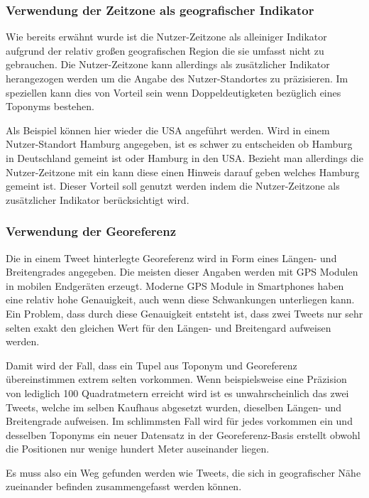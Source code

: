 					\subsubsection{Verwendung der Zeitzone als geografischer Indikator}

						Wie bereits erwähnt wurde ist die Nutzer-Zeitzone als alleiniger Indikator aufgrund der relativ großen geografischen Region die sie umfasst nicht zu gebrauchen. 
						Die Nutzer-Zeitzone kann allerdings als zusätzlicher Indikator herangezogen werden um die Angabe des Nutzer-Standortes zu präzisieren.	
						Im speziellen kann dies von Vorteil sein wenn Doppeldeutigketen bezüglich eines Toponyms bestehen. 

						Als Beispiel können hier wieder die USA angeführt werden. 
						Wird in einem Nutzer-Standort Hamburg angegeben, ist es schwer zu entscheiden ob Hamburg in Deutschland gemeint ist oder Hamburg in den USA. 
						Bezieht man allerdings die Nutzer-Zeitzone mit ein kann diese einen Hinweis darauf geben welches Hamburg gemeint ist.
						Dieser Vorteil soll genutzt werden indem die Nutzer-Zeitzone als zusätzlicher Indikator berücksichtigt wird.  

					\subsubsection{Verwendung der Georeferenz}  
						Die in einem Tweet hinterlegte Georeferenz wird in Form eines Längen- und Breitengrades angegeben.
						Die meisten dieser Angaben werden mit GPS Modulen in mobilen Endgeräten erzeugt. 
						Moderne GPS Module in Smartphones haben eine relativ hohe Genauigkeit, auch wenn diese Schwankungen unterliegen kann.
						Ein Problem, dass durch diese Genauigkeit entsteht ist, dass zwei Tweets nur sehr selten exakt den gleichen Wert für den Längen- und Breitengard aufweisen werden.

						Damit wird der Fall, dass ein Tupel aus Toponym und Georeferenz übereinstimmen extrem selten vorkommen.
						Wenn beispielsweise eine Präzision von lediglich 100 Quadratmetern erreicht wird ist es unwahrscheinlich das zwei Tweets, welche im selben Kaufhaus abgesetzt wurden, dieselben Längen- und Breitengrade aufweisen.
						Im schlimmsten Fall wird für jedes vorkommen ein und desselben Toponyms ein neuer Datensatz in der Georeferenz-Basis erstellt obwohl die Positionen nur wenige hundert Meter auseinander liegen.

						Es muss also ein Weg gefunden werden wie Tweets, die sich in geografischer Nähe zueinander befinden zusammengefasst werden können.

